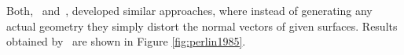 Both,~\cite{Schachter:1980} and~\cite{Perlin:1985}, developed similar approaches,
where instead of generating any actual geometry they simply distort the normal
vectors of given surfaces. Results obtained by~\citeauthor{Perlin:1985} are
shown in Figure \ref{fig:perlin1985}.
%
\begin{figure}
 \centering
 \hfill
 \hfill
 \subtop[]
 {
}
\end{figure}
